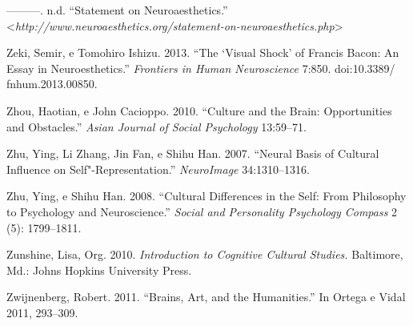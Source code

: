 ---------. n.d. ``Statement on Neuroaesthetics.''
\textless{}\emph{http://www.neuroaesthetics.org/statement-on-neuroaesthetics.php}\textgreater{}

Zeki, Semir, e Tomohiro Ishizu. 2013. ``The `Visual Shock' of Francis
Bacon: An Essay in Neuroesthetics.'' \emph{Frontiers in Human
Neuroscience} 7:850. doi:10.3389/ fnhum.2013.00850.

Zhou, Haotian, e John Cacioppo. 2010. ``Culture and the Brain:
Opportunities and Obstacles.'' \emph{Asian Journal of Social Psychology}
13:59--71.

Zhu, Ying, Li Zhang, Jin Fan, e Shihu Han. 2007. ``Neural Basis of
Cultural Influence on Self"-Representation.'' \emph{NeuroImage}
34:1310--1316.

Zhu, Ying, e Shihu Han. 2008. ``Cultural Differences in the Self: From
Philosophy to Psychology and Neuroscience.'' \emph{Social and
Personality Psychology Compass} 2 (5): 1799--1811.

Zunshine, Lisa, Org. 2010. \emph{Introduction to Cognitive Cultural
Studies.} Baltimore, Md.: Johns Hopkins University Press.

Zwijnenberg, Robert. 2011. ``Brains, Art, and the Humanities.'' In
Ortega e Vidal 2011, 293--309.
